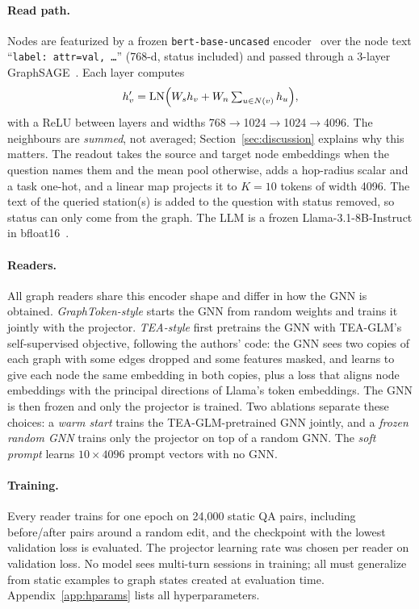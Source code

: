 \documentclass[11pt]{article}
\begin{document}
\paragraph{Read path.}
Nodes are featurized by a frozen \texttt{bert-base-uncased} encoder~\cite{devlin-etal-2019-bert} over the node text ``\texttt{label: attr=val, \ldots}'' (768-d, status included) and passed through a 3-layer GraphSAGE~\cite{hamilton2017inductive}.
Each layer computes
\begin{equation}
h_v' = \mathrm{LN}\Bigl(W_s h_v + W_n \textstyle\sum_{u\in N(v)} h_u\Bigr),
\end{equation}
with a ReLU between layers and widths 768$\to$1024$\to$1024$\to$4096.
The neighbours are \emph{summed}, not averaged; Section~\ref{sec:discussion} explains why this matters.
The readout takes the source and target node embeddings when the question names them and the mean pool otherwise, adds a hop-radius scalar and a task one-hot, and a linear map projects it to $K{=}10$ tokens of width 4096.
The text of the queried station(s) is added to the question with status removed, so status can only come from the graph.
The LLM is a frozen Llama-3.1-8B-Instruct in bfloat16~\cite{llama3modelcard}.

\paragraph{Readers.}
All graph readers share this encoder shape and differ in how the GNN is obtained.
\emph{GraphToken-style} starts the GNN from random weights and trains it jointly with the projector.
\emph{TEA-style} first pretrains the GNN with TEA-GLM's self-supervised objective, following the authors' code: the GNN sees two copies of each graph with some edges dropped and some features masked, and learns to give each node the same embedding in both copies, plus a loss that aligns node embeddings with the principal directions of Llama's token embeddings.
The GNN is then frozen and only the projector is trained.
Two ablations separate these choices: a \emph{warm start} trains the TEA-GLM-pretrained GNN jointly, and a \emph{frozen random GNN} trains only the projector on top of a random GNN.
The \emph{soft prompt} learns $10\times4096$ prompt vectors with no GNN.

\paragraph{Training.}
Every reader trains for one epoch on 24{,}000 static QA pairs, including before/after pairs around a random edit, and the checkpoint with the lowest validation loss is evaluated.
The projector learning rate was chosen per reader on validation loss.
No model sees multi-turn sessions in training; all must generalize from static examples to graph states created at evaluation time.
Appendix~\ref{app:hparams} lists all hyperparameters.
\end{document}
